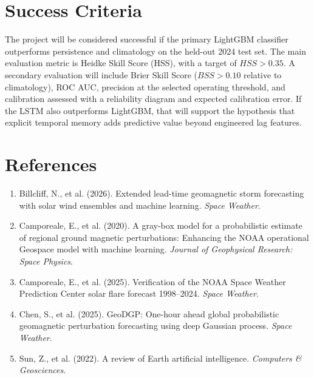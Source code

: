 \documentclass{article}
\begin{document}
\section*{Success Criteria}
The project will be considered successful if the primary LightGBM classifier outperforms persistence and climatology on the held-out 2024 test set. The main evaluation metric is Heidke Skill Score (HSS), with a target of \(HSS > 0.35\). A secondary evaluation will include Brier Skill Score (\(BSS > 0.10\) relative to climatology), ROC AUC, precision at the selected operating threshold, and calibration assessed with a reliability diagram and expected calibration error. If the LSTM also outperforms LightGBM, that will support the hypothesis that explicit temporal memory adds predictive value beyond engineered lag features.

\newpage
\section*{References}
 
\begin{enumerate}
    \item Billcliff, N., et al. (2026). Extended lead-time geomagnetic storm forecasting with solar wind ensembles and machine learning. \textit{Space Weather}.
 
    \item Camporeale, E., et al. (2020). A gray-box model for a probabilistic estimate of regional ground magnetic perturbations: Enhancing the NOAA operational Geospace model with machine learning. \textit{Journal of Geophysical Research: Space Physics}.
 
    \item Camporeale, E., et al. (2025). Verification of the NOAA Space Weather Prediction Center solar flare forecast 1998--2024. \textit{Space Weather}.
 
    \item Chen, S., et al. (2025). GeoDGP: One-hour ahead global probabilistic geomagnetic perturbation forecasting using deep Gaussian process. \textit{Space Weather}.
 
    \item Sun, Z., et al. (2022). A review of Earth artificial intelligence. \textit{Computers \& Geosciences}.
\end{enumerate}
\end{document}
